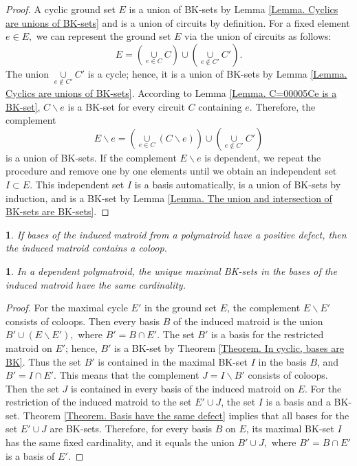 \documentclass[11pt]{article}
\theoremstyle{plain}
\theoremstyle{definition}
\theoremstyle{remark}
\theoremstyle{plain}
\theoremstyle{plain}
\theoremstyle{plain}
\newtheorem{cor}[thm]{\protect\corollaryname}
\theoremstyle{definition}
\providecommand{\corollaryname}{Corollary}
\begin{document}
\begin{proof}
A cyclic ground set $E$ is a union of BK-sets by Lemma \ref{Lemma. Cyclics are unions of BK-sets}
and is a union of circuits by definition. For a fixed element $e\in E,$
we can represent the ground set $E$ via the union of circuits as
follows:
\[
E=\left(\underset{e\in C}{\cup}C\right)\cup\left(\underset{e\notin C'}{\cup}C'\right).
\]
The union $\underset{e\notin C'}{\cup}C'$ is a cycle; hence, it is
a union of BK-sets by Lemma \ref{Lemma. Cyclics are unions of BK-sets}.
According to Lemma \ref{Lemma. C=00005Ce is a BK-set}, $C\backslash e$
is a BK-set for every circuit $C$ containing $e.$ Therefore, the
complement
\[
E\backslash e=\left(\underset{e\in C}{\cup}(C\backslash e)\right)\cup\left(\underset{e\notin C'}{\cup}C'\right)
\]
is a union of BK-sets. If the complement $E\backslash e$ is dependent,
we repeat the procedure and remove one by one elements until we obtain
an independent set $I\subset E$. This independent set $I$ is a basis
automatically, is a union of BK-sets by induction, and is a BK-set
by Lemma \ref{Lemma. The union and intersection of BK-sets are BK-sets}.
\end{proof}
\begin{cor}
If bases of the induced matroid from a polymatroid have a positive
defect, then the induced matroid contains a coloop.
\end{cor}

\begin{cor}
\label{Corollary. BK-sets in bases have the same cardinality}In a
dependent polymatroid, the unique maximal BK-sets in the bases of
the induced matroid have the same cardinality.
\end{cor}

\begin{proof}
For the maximal cycle $E'$ in the ground set $E$, the complement
$E\backslash E'$ consists of coloops. Then every basis $B$ of the
induced matroid is the union $B'\cup(E\backslash E'),$ where $B'=B\cap E'$.
The set $B'$ is a basis for the restricted matroid on $E'$; hence,
$B'$ is a BK-set by Theorem \ref{Theorem. In cyclic, bases are BK}.
Thus the set $B'$ is contained in the maximal BK-set $I$ in the
basis $B$, and $B'=I\cap E'$. This means that the complement $J=I\backslash B'$
consists of coloops. Then the set $J$ is contained in every basis
of the induced matroid on $E$. For the restriction of the induced
matroid to the set $E'\cup J$, the set $I$ is a basis and a BK-set.
Theorem \ref{Theorem. Basis have the same defect} implies that all
bases for the set $E'\cup J$ are BK-sets. Therefore, for every basis
$B$ on $E$, its maximal BK-set $I$ has the same fixed cardinality,
and it equals the union $B'\cup J,$ where $B'=B\cap E'$ is a basis
of $E'$.
\end{proof}
\end{document}
